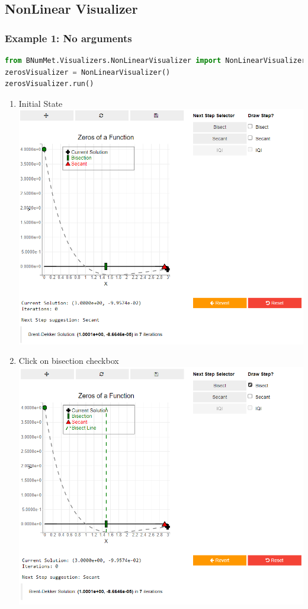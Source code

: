 \subsection{NonLinear Visualizer}
\subsubsection{Example 1: No arguments}
\begin{lstlisting}[language=Python]
from BNumMet.Visualizers.NonLinearVisualizer import NonLinearVisualizer
zerosVisualizer = NonLinearVisualizer()
zerosVisualizer.run()
\end{lstlisting}
\begin{enumerate}
    \item Initial State\\
    \includegraphics[scale=0.6]{Include/Images/Thesis/Documentation/Visualizers/NonLinear/Example 1/Example 1 - 00 - Initial State.png}
    \item Click on bisection checkbox\\
    \includegraphics[scale=0.6]{Include/Images/Thesis/Documentation/Visualizers/NonLinear/Example 1/Example 1 - 01 - Bisection Checkbox.png}

\end{enumerate}
